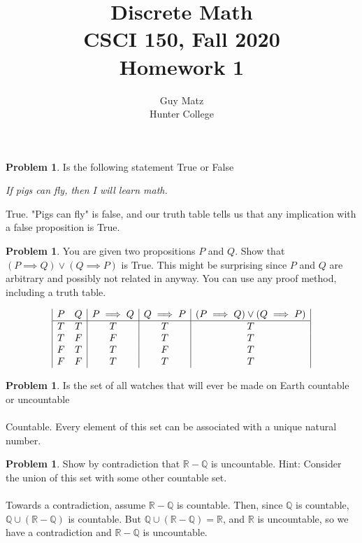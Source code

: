 \documentclass[10pt,leqno ]{article}
\title{Discrete Math\\
CSCI 150, Fall 2020\\
Homework 1}
\author{Guy Matz \\
Hunter College}
\theoremstyle{definition}
\newtheorem{problem}[theorem]{Problem}
\begin{document}
\begin{problem}  Is the following statement True or False
\begin{center}
\textit{If pigs can fly, then I will learn math.}
\end{center}
\Large
True.  "Pigs can fly" is false, and our truth table tells us that any implication with a false proposition is True.
\end{problem}
\newpage

\begin{problem} You are given two propositions $P$ and $Q$.  Show that $(P \implies Q) \vee (Q \implies P)$ is True.  This might be surprising since $P$ and $Q$ are arbitrary and possibly not related in anyway.  You can use any proof method, including a truth table.
\\
\Large

\begin{displaymath}
\begin{array}{|c c|c|c|c|}
P & Q & P \implies Q & Q \implies P & (P \implies Q) \lor (Q \implies P) \\
\hline  
T & T & T & T & T\\
T & F & F & T & T\\
F & T & T & F & T\\
F & F & T & T & T\\
\end{array}
\end{displaymath}

\end{problem}
\newpage

\begin{problem} Is  the  set  of  all  watches  that  will  ever  be  made  on  Earth  countable  or uncountable
\\\\
\Large
Countable.  Every element of this set can be associated with a unique natural number. 
\end{problem}
\newpage

\begin{problem} Show  by  contradiction  that $\mathbb{R} - \mathbb{Q}$ is  uncountable.  Hint: Consider the union of this set with some other countable set.
\\\\
\Large
Towards a contradiction, assume $\mathbb{R} - \mathbb{Q}$ is countable.  Then, since $\mathbb{Q}$ is countable, $\mathbb{Q} \cup (\mathbb{R} - \mathbb{Q})$ is countable.  But $\mathbb{Q} \cup (\mathbb{R} - \mathbb{Q}) = \mathbb{R}$, and $\mathbb{R}$ is uncountable, so
we have a contradiction and $\mathbb{R} - \mathbb{Q}$ is uncountable.
\end{problem}
\end{document}
